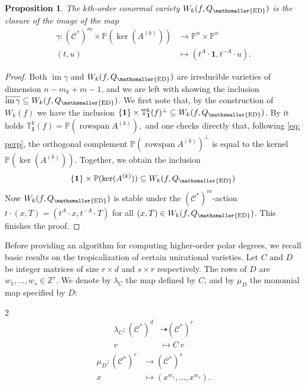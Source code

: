 \documentclass[11pt,reqno]{amsart}
\numberwithin{equation}{section}
\theoremstyle{plain}
\numberwithin{theorem}{section}
\newtheorem{proposition}[theorem]{Proposition}
\theoremstyle{definition}
\renewcommand{\P}{\mathbb{P}}
\newcommand{\Z}{\mathbb{Z}}
\newcommand{\T}{\mathbb{T}}
\newcommand{\CC}{\mathcal{C}}
\def\bone{{\boldsymbol{1}}}
\newcommand{\image}{\operatorname{im}}
\newcommand{\rowspan}{\operatorname{rowspan}}
\newcommand{\mED}{\mathsmaller{\mathrm{ED}}}
\begin{document}
\begin{proposition}
\label{prop: parametrization for conormal variety}
The $k$th-order conormal variety $W_k(f,Q_\mED)$ is the closure of the image of the map
\begin{align*}
    \gamma\colon (\CC^*)^m \times \P(\ker(A^{(k)} )) &\longrightarrow \P^{n} \times \P^{n}\\
    (t, u) & \longmapsto (t^A \cdot \bone, t^{-A} \cdot u).
\end{align*}
\end{proposition}
\begin{proof}
Both $\overline{\image\gamma}$ and $W_k(f,Q_\mED)$ are irreducible varieties of dimension $n-m_k+m-1$, and we are left with showing the inclusion $\overline{\image\gamma} \subseteq W_k(f,Q_\mED)$.
We first note that, by the construction of $W_k(f)$ we have the inclusion $\{\bone\}\times \T_{\bone}^k(f)^\perp \subseteq W_k(f,Q_\mED)$.
By \cite[Lemma 5.2]{Higher_duality_and_toric} it holds $\T_{\bone}^k(f) = \P(\rowspan A^{(k)}),$ and one checks directly that, following \eqref{eq: perp}, the orthogonal complement $\P(\rowspan A^{(k)})^\perp$ is equal to the kernel $\P(\ker(A^{(k)} ))$.
Together, we obtain the inclusion
\[
\{\bone\} \times \P(\ker(A^{(k)} )) \subseteq W_k(f,{Q_\mED})\,
\]
Now $W_k(f,Q_\mED)$ is stable under the $(\CC^*)^m$-action $t \cdot (x, T) =  (t^A \cdot x , t^{-A} \cdot T )$ for all $(x, T) \in W_k(f,Q_\mED)$. This finishes the proof.
\end{proof}


Before providing an algorithm for computing higher-order polar degrees, we recall basic results on the tropicalization of certain unirational varieties.
Let $C$ and $D$ be integer matrices of size $r \times d$ and $s \times r$ respectively. The rows of $D$ are $w_1,\dots,w_s \in \Z^r$.
We denote by $\lambda_C$ the map defined by $C$, and by $\mu_D$ the monomial map specified by $D$:
\begin{multicols}{2}
\noindent
\begin{align*}
\lambda_C \colon (\CC^*)^d &\dashrightarrow (\CC^*)^r \\
v &\longmapsto C\,v
\end{align*}
\begin{align}\label{eq: parametrization of YUV}
\begin{split}
\mu_D \colon (\CC^*)^r &\longrightarrow (\CC^*)^s \\
x &\longmapsto (x^{w_1},\dots,x^{w_s}).
\end{split}
\end{align}
\end{multicols}
\end{document}
